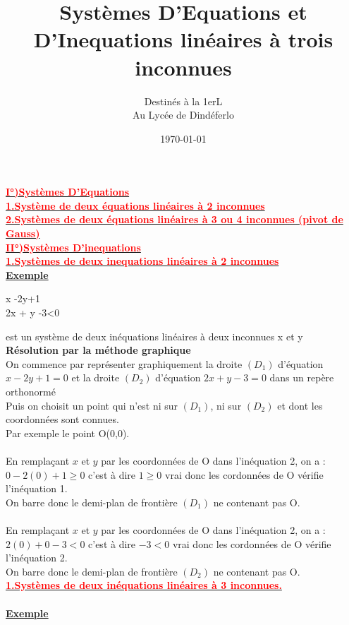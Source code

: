 \documentclass[12pt]{article}
\author{Destinés à la 1erL\\Au Lycée de Dindéferlo}
\title{\textbf{Systèmes D'Equations et D'Inequations linéaires à trois inconnues}}
\date{\today}
\begin{document}
\maketitle
\newpage


\underline{\textbf{\textcolor{red}{I°)Systèmes D'Equations}}}\\


\underline{\textbf{\textcolor{red}{1.Système de deux équations linéaires à 2 inconnues}}}\\

\underline{\textbf{\textcolor{red}{2.Systèmes de deux équations linéaires à 3 ou 4 inconnues (pivot de Gauss)}}}\\


\underline{\textbf{\textcolor{red}{II°)Systèmes D'inequations}}}\\

\underline{\textbf{\textcolor{red}{1.Systèmes de deux inequations linéaires à 2 inconnues}}}\\

\underline{\textbf{Exemple}}\\

\begin{System}
  x -2y+1 \\
  2x + y -3<0
\end{System}
est un système de deux inéquations linéaires à deux inconnues x et y\\

\textbf{Résolution par la méthode graphique}\\
On commence par représenter graphiquement la droite $(D_{1})$ d'équation \\$x -2y+1=0$ et la droite $(D_{2})$ d'équation $2x + y -3=0$ dans un repère \\orthonormé\\

Puis on choisit un point qui n'est ni sur $(D_{1})$, ni sur $(D_{2})$ et dont les coordonnées sont connues.\\
Par exemple le point O(0,0).\\
\\
En remplaçant $x$ et $y$ par les coordonnées de O dans l'inéquation 2, on a : 
$0-2(0)+1\geq0$ c'est à dire $1\geq0$ vrai donc les cordonnées de O vérifie l'inéquation 1.
\\
On barre donc le demi-plan de frontière $(D_{1})$ ne contenant pas O.\\
\\
En remplaçant $x$ et $y$ par les coordonnées de O dans l'inéquation 2, on a : 
$2(0)+0-3<0$ c'est à dire $-3<0$ vrai donc les cordonnées de O vérifie l'inéquation 2.
\\
On barre donc le demi-plan de frontière $(D_{2})$ ne contenant pas O.\\
\underline{\textbf{\textcolor{red}{1.Systèmes de deux inéquations linéaires à 3 inconnues.}}}\\
\\
\underline{\textbf{Exemple}}\\
\end{document}
